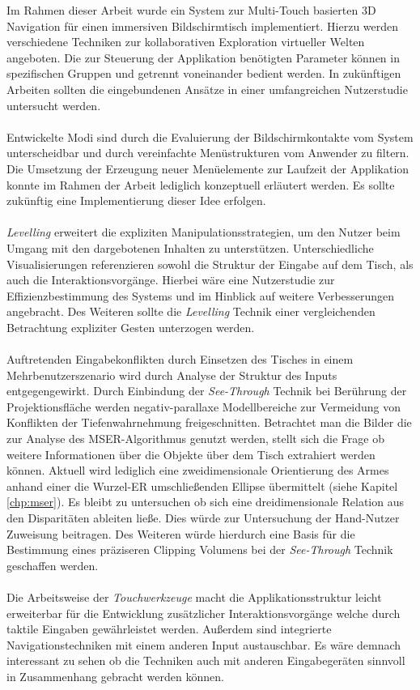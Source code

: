 Im Rahmen dieser Arbeit wurde ein System zur Multi-Touch basierten 3D Navigation für einen immersiven Bildschirmtisch implementiert. Hierzu werden verschiedene Techniken zur kollaborativen Exploration virtueller Welten angeboten. Die zur Steuerung der Applikation benötigten Parameter können in spezifischen Gruppen und getrennt voneinander bedient werden. In zukünftigen Arbeiten sollten die eingebundenen Ansätze in einer umfangreichen Nutzerstudie untersucht werden.
\\\\
Entwickelte Modi sind durch die Evaluierung der Bildschirmkontakte vom System unterscheidbar und durch vereinfachte Menüstrukturen vom Anwender zu filtern. Die Umsetzung der Erzeugung neuer Menüelemente zur Laufzeit der Applikation konnte im Rahmen der Arbeit lediglich konzeptuell erläutert werden. Es sollte zukünftig eine Implementierung dieser Idee erfolgen.
\\\\
\emph{Levelling} erweitert die expliziten Manipulationsstrategien, um den Nutzer beim Umgang mit den dargebotenen Inhalten zu unterstützen. Unterschiedliche Visualisierungen referenzieren sowohl die Struktur der Eingabe auf dem Tisch, als auch die Interaktionsvorgänge. Hierbei wäre eine Nutzerstudie zur Effizienzbestimmung des Systems und im Hinblick auf weitere Verbesserungen angebracht. Des Weiteren sollte die \emph{Levelling} Technik einer vergleichenden Betrachtung expliziter Gesten unterzogen werden.  
\\\\
Auftretenden Eingabekonflikten durch Einsetzen des Tisches in einem Mehrbenutzerszenario wird durch Analyse der Struktur des Inputs entgegengewirkt. Durch Einbindung der \emph{See-Through} Technik bei Berührung der Projektionsfläche werden negativ-parallaxe Modellbereiche zur Vermeidung von Konflikten der Tiefenwahrnehmung freigeschnitten. Betrachtet man die Bilder die zur Analyse des MSER-Algorithmus genutzt werden, stellt sich die Frage ob weitere Informationen über die Objekte über dem Tisch extrahiert werden können. Aktuell wird lediglich eine zweidimensionale Orientierung des Armes anhand einer die Wurzel-ER umschließenden Ellipse übermittelt (siehe Kapitel \ref{chp:mser}). Es bleibt zu untersuchen ob sich eine dreidimensionale Relation aus den Disparitäten ableiten ließe. Dies würde zur Untersuchung der Hand-Nutzer Zuweisung beitragen. Des Weiteren würde hierdurch eine Basis für die Bestimmung eines präziseren Clipping Volumens bei der \emph{See-Through} Technik geschaffen werden.
\\\\
Die Arbeitsweise der \emph{Touchwerkzeuge} macht die Applikationsstruktur leicht erweiterbar für die Entwicklung zusätzlicher Interaktionsvorgänge welche durch taktile Eingaben gewährleistet werden. Außerdem sind integrierte Navigationstechniken mit einem anderen Input austauschbar. Es wäre demnach interessant zu sehen ob die Techniken auch mit anderen Eingabegeräten sinnvoll in Zusammenhang gebracht werden können.
